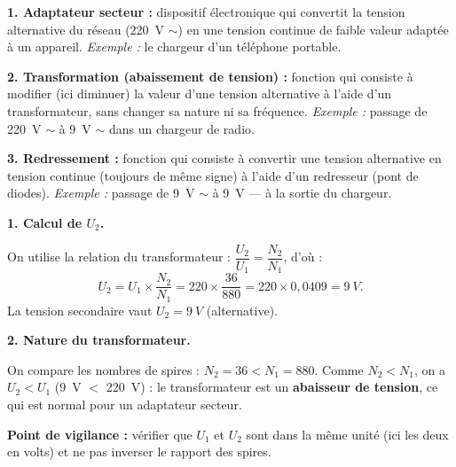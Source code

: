 \documentclass[11pt]{article}
\begin{document}
\begin{corrige}
\textbf{1. Adaptateur secteur :} dispositif électronique qui convertit la tension alternative du réseau (\SI{220}{V} $\sim$) en une tension continue de faible valeur adaptée à un appareil. \emph{Exemple :} le chargeur d'un téléphone portable.

\textbf{2. Transformation (abaissement de tension) :} fonction qui consiste à modifier (ici diminuer) la valeur d'une tension alternative à l'aide d'un transformateur, sans changer sa nature ni sa fréquence. \emph{Exemple :} passage de \SI{220}{V} $\sim$ à \SI{9}{V} $\sim$ dans un chargeur de radio.

\textbf{3. Redressement :} fonction qui consiste à convertir une tension alternative en tension continue (toujours de même signe) à l'aide d'un redresseur (pont de diodes). \emph{Exemple :} passage de \SI{9}{V} $\sim$ à \SI{9}{V} $\text{---}$ à la sortie du chargeur.
\end{corrige}

\begin{corrige}
\textbf{1. Calcul de $U_2$.}

On utilise la relation du transformateur : $\dfrac{U_2}{U_1} = \dfrac{N_2}{N_1}$, d'où :
\[
U_2 = U_1 \times \frac{N_2}{N_1} = 220 \times \frac{36}{880} = 220 \times 0{,}0409 = \SI{9}{V}.
\]
La tension secondaire vaut $U_2 = \SI{9}{V}$ (alternative).

\textbf{2. Nature du transformateur.}

On compare les nombres de spires : $N_2 = 36 < N_1 = 880$. Comme $N_2 < N_1$, on a $U_2 < U_1$ (\SI{9}{V} $<$ \SI{220}{V}) : le transformateur est un \textbf{abaisseur de tension}, ce qui est normal pour un adaptateur secteur.

\textbf{Point de vigilance :} vérifier que $U_1$ et $U_2$ sont dans la même unité (ici les deux en volts) et ne pas inverser le rapport des spires.
\end{corrige}
\end{document}

